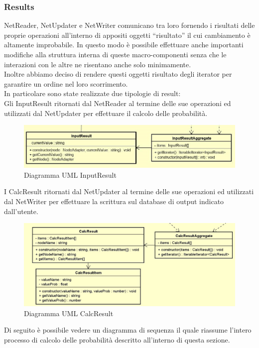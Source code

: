 \subsubsection{Results}
NetReader, NetUpdater e NetWriter comunicano tra loro fornendo i risultati delle proprie operazioni  all'interno di appositi oggetti “risultato” il cui cambiamento è altamente improbabile. In questo modo è possibile effettuare anche importanti modifiche alla struttura interna di queste macro-componenti senza che le interazioni con le altre ne risentano anche solo minimamente.\\
Inoltre abbiamo deciso di rendere questi oggetti risultato degli iterator per garantire un ordine nel loro scorrimento.\\
In particolare sono state realizzate due tipologie di result:\\
Gli InputResult ritornati dal NetReader al termine delle sue operazioni ed utilizzati dal NetUpdater per effettuare il calcolo delle probabilità.
\begin{figure} [H]
	\centering
	\includegraphics[scale=0.65]{Img/InputResult}
	\caption{Diagramma UML InputResult}\label{}
\end{figure}
I CalcResult ritornati dal NetUpdater al termine delle sue operazioni ed utilizzati dal NetWriter per effettuare la scrittura sul database di output indicato dall'utente.
\begin{figure} [H]
	\centering
	\includegraphics[scale=0.5]{Img/CalcResult}
	\caption{Diagramma UML CalcResult}\label{}
\end{figure}
Di seguito è possibile vedere un diagramma di sequenza il quale riassume l'intero processo di calcolo delle probabilità descritto all'interno di questa sezione.
